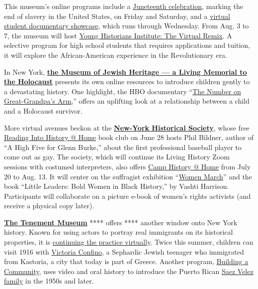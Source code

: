 This museum's online programs include a
\href{https://nmaahc.si.edu/event/juneteenth-celebration-resilience?trumbaEmbed=view\%3Devent\%26eventid\%3D145373621}{Juneteenth
celebration}, marking the end of slavery in the United States, on Friday
and Saturday, and a
\href{https://nmaahc.si.edu/event/nhd-nmaahc-virtual-student-documentary-showcase?trumbaEmbed=view\%3Devent\%26eventid\%3D143246785}{virtual
student documentary showcase}, which runs through Wednesday. From Aug. 3
to 7, the museum will host
\href{https://nmaahc.si.edu/learn/students/young-historians-institute-virtual-remix}{Young
Historians Institute: The Virtual Remix}. A selective program for high
school students that requires applications and tuition, it will explore
the African-American experience in the Revolutionary era.

In New York, \textbf{\href{https://mjhnyc.org/}{the Museum of Jewish
Heritage --- a Living Memorial to the Holocaust}} presents its own
online resources to introduce children gently to a devastating history.
One highlight, the HBO documentary
``\href{https://www.nytimes3xbfgragh.onion/2018/04/19/arts/events-for-children-in-nyc-this-week.html}{The
Number on Great-Grandpa's Arm},'' offers an uplifting look at a
relationship between a child and a Holocaust survivor.

More virtual avenues beckon at the
\textbf{\href{https://www.nyhistory.org/}{New-York Historical Society}},
whose free
\href{https://www.nyhistory.org/childrens-museum/family-programs?reading-history-home-high-five-glenn-burke/june/28/2020}{Reading
Into History @ Home} book club on June 28 hosts Phil Bildner, author of
``A High Five for Glenn Burke,'' about the first professional baseball
player to come out as gay. The society, which will continue its Living
History Zoom sessions with costumed interpreters, also offers
\href{https://www.nyhistory.org/childrens-museum/family-programs?camp-history-home-women-march/july/20/2020}{Camp
History @ Home} from July 20 to Aug. 13. It will center on the
suffragist exhibition
``\href{https://www.nyhistory.org/exhibitions/women-march}{Women
March}'' and the book ``Little Leaders: Bold Women in Black History,''
by Vashti Harrison. Participants will collaborate on a picture e-book of
women's rights activists (and receive a physical copy later).

\textbf{\href{https://www.tenement.org/}{The Tenement Museum}} ****
offers **** another window onto New York history. Known for using actors
to portray real immigrants on its historical properties, it is
\href{https://www.tenement.org/events/}{continuing the practice
virtually}. Twice this summer, children can visit 1916 with
\href{https://www.tenement.org/events/virtual-family-event-meet-victoria-confino-june-24/}{Victoria
Confino}, a Sephardic Jewish teenager who immigrated from Kastoria, a
city that today is part of Greece. Another program,
\href{https://www.tenement.org/events/virtual-family-event-building-a-community-july-8/}{Building
a Community}, uses video and oral history to introduce the Puerto Rican
\href{https://www.tenement.org/events/virtual-family-event-building-a-community-july-8/}{Saez
Velez family} in the 1950s and later.

